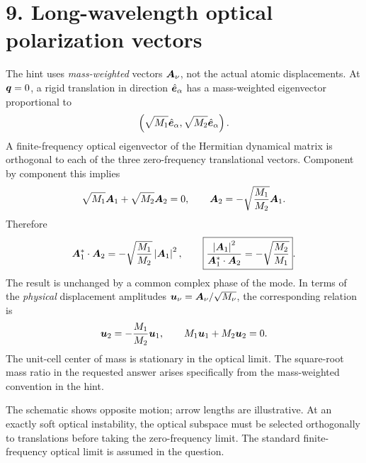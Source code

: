 \section*{9. Long-wavelength optical polarization vectors}
The hint uses \emph{mass-weighted} vectors $\boldsymbol{A}_\nu$, not the actual atomic displacements. At $\boldsymbol{q}=0$, a rigid translation in direction $\hat{\boldsymbol{e}}_\alpha$ has a mass-weighted eigenvector proportional to
\[
\left(\sqrt{M_1}\hat{\boldsymbol{e}}_\alpha,
      \sqrt{M_2}\hat{\boldsymbol{e}}_\alpha\right).
\]
A finite-frequency optical eigenvector of the Hermitian dynamical matrix is orthogonal to each of the three zero-frequency translational vectors. Component by component this implies
\[
\sqrt{M_1}\boldsymbol{A}_1+\sqrt{M_2}\boldsymbol{A}_2=0,
\qquad
\boldsymbol{A}_2=-\sqrt{\frac{M_1}{M_2}}\boldsymbol{A}_1.
\]
Therefore
\[
\boldsymbol{A}_1^*\cdot\boldsymbol{A}_2
=-\sqrt{\frac{M_1}{M_2}}\left|\boldsymbol{A}_1\right|^2,
\qquad
\boxed{\frac{\left|\boldsymbol{A}_1\right|^2}{\boldsymbol{A}_1^*\cdot\boldsymbol{A}_2}
=-\sqrt{\frac{M_2}{M_1}}}.
\]
The result is unchanged by a common complex phase of the mode. In terms of the \emph{physical} displacement amplitudes $\boldsymbol{u}_\nu=\boldsymbol{A}_\nu/\sqrt{M_\nu}$, the corresponding relation is
\[
\boldsymbol{u}_2=-\frac{M_1}{M_2}\boldsymbol{u}_1,
\qquad M_1\boldsymbol{u}_1+M_2\boldsymbol{u}_2=0.
\]
The unit-cell center of mass is stationary in the optical limit. The square-root mass ratio in the requested answer arises specifically from the mass-weighted convention in the hint.

\begin{center}
\end{center}
The schematic shows opposite motion; arrow lengths are illustrative. At an exactly soft optical instability, the optical subspace must be selected orthogonally to translations before taking the zero-frequency limit. The standard finite-frequency optical limit is assumed in the question.

